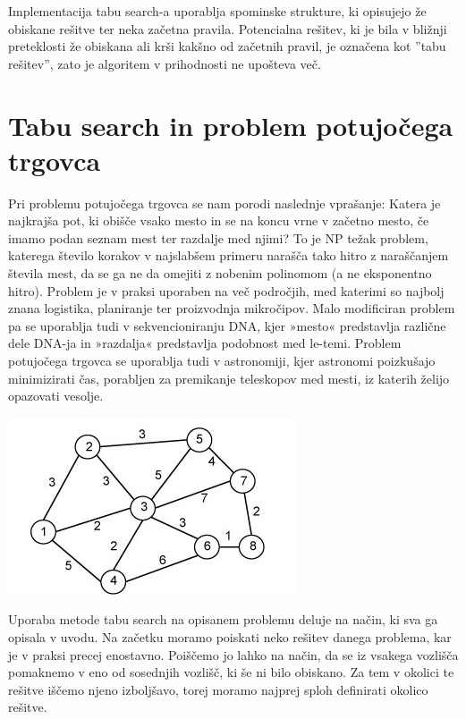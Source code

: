 \documentclass[10pt, a4paper]{article}
\begin{document}
Implementacija tabu search-a uporablja spominske strukture, ki opisujejo že obiskane rešitve ter neka začetna pravila. Potencialna rešitev, ki je bila v bližnji preteklosti že obiskana ali krši kakšno od začetnih pravil, je označena kot ''tabu rešitev'', zato je algoritem v prihodnosti ne upošteva več.




\section{Tabu search in problem potujočega trgovca}

Pri problemu potujočega trgovca se nam porodi naslednje vprašanje: Katera je najkrajša pot, ki obišče vsako mesto in se na koncu vrne v začetno mesto, če imamo podan seznam mest ter razdalje med njimi? To je NP težak problem, katerega število korakov v najslabšem primeru narašča tako hitro z naraščanjem števila mest, da se ga ne da omejiti z nobenim polinomom (a ne eksponentno hitro). Problem je v praksi uporaben na več področjih, med katerimi so najbolj znana logistika, planiranje ter proizvodnja mikročipov. Malo modificiran problem pa se uporablja tudi v sekvencioniranju DNA, kjer »mesto« predstavlja različne dele DNA-ja in »razdalja« predstavlja podobnost med le-temi. Problem potujočega trgovca se uporablja tudi v astronomiji, kjer astronomi poizkušajo minimizirati čas, porabljen za premikanje teleskopov med mesti, iz katerih želijo opazovati vesolje.

\begin{center}
\includegraphics[scale=0.5]{slika1}
\end{center}

Uporaba metode tabu search na opisanem problemu deluje na način, ki sva ga opisala v uvodu. Na začetku moramo poiskati neko rešitev danega problema, kar je v praksi precej enostavno. Poiščemo jo lahko na način, da se iz vsakega vozlišča pomaknemo v eno od sosednjih vozlišč, ki še ni bilo obiskano. Za tem v okolici te rešitve iščemo njeno izboljšavo, torej moramo najprej sploh definirati okolico rešitve.
\end{document}
